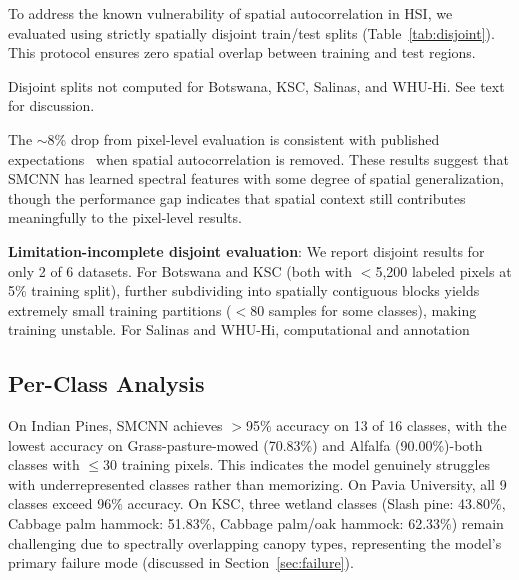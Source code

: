 \documentclass[conference]{IEEEtran}
\begin{document}
{To address the known vulnerability of spatial autocorrelation in HSI, we evaluated using strictly spatially disjoint train/test splits (Table~\ref{tab:disjoint}). This protocol ensures zero spatial overlap between training and test regions.

\begin{table}[!t]
\caption{Spatially Disjoint Evaluation}
\label{tab:disjoint}
\centering
{}
\begin{flushleft}
\footnotesize{Disjoint splits not computed for Botswana, KSC, Salinas, and WHU-Hi. See text for discussion.}
\end{flushleft}
\end{table}

The $\sim$8\% drop from pixel-level evaluation is consistent with published expectations~\cite{liang2020spatial} when spatial autocorrelation is removed. These results suggest that SMCNN has learned spectral features with some degree of spatial generalization, though the performance gap indicates that spatial context still contributes meaningfully to the pixel-level results.

\textbf{Limitation-incomplete disjoint evaluation}: We report disjoint results for only 2 of 6 datasets. For Botswana and KSC (both with $<$5,200 labeled pixels at 5\% training split), further subdividing into spatially contiguous blocks yields extremely small training partitions ($<$80 samples for some classes), making training unstable. For Salinas and WHU-Hi, computational and annotation \subsection{Per-Class Analysis}

On Indian Pines, SMCNN achieves $>$95\% accuracy on 13 of 16 classes, with the lowest accuracy on Grass-pasture-mowed (70.83\%) and Alfalfa (90.00\%)-both classes with $\leq$30 training pixels. This indicates the model genuinely struggles with underrepresented classes rather than memorizing. On Pavia University, all 9 classes exceed 96\% accuracy. On KSC, three wetland classes (Slash pine: 43.80\%, Cabbage palm hammock: 51.83\%, Cabbage palm/oak hammock: 62.33\%) remain challenging due to spectrally overlapping canopy types, representing the model's primary failure mode (discussed in Section~\ref{sec:failure}).

}
\end{document}
